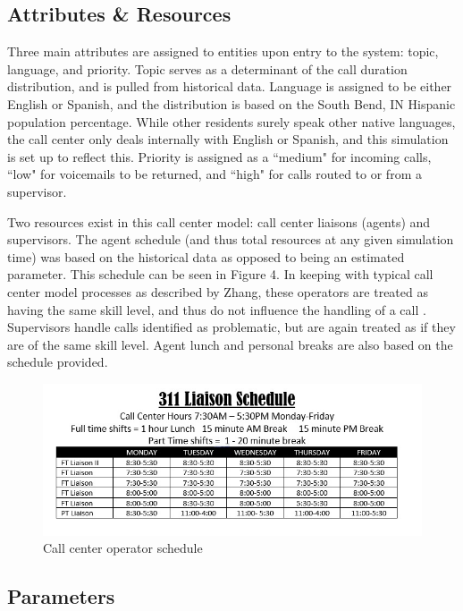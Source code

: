 \documentclass[12pt,twocolumn]{article}
\begin{document}
	\subsection{Attributes \& Resources}

Three main attributes are assigned to entities upon entry to the system:  topic, language, and priority.  Topic serves as a determinant of the call duration distribution, and is pulled from historical data.  Language is assigned to be either English or Spanish, and the distribution is based on the South Bend, IN Hispanic population percentage.  While other residents surely speak other native languages, the call center only deals internally with English or Spanish, and this simulation is set up to reflect this.  Priority is assigned as a ``medium" for incoming calls, ``low" for voicemails to be returned, and ``high" for calls routed to or from a supervisor.

\par

Two resources exist in this call center model:  call center liaisons (agents) and supervisors.  The agent schedule (and thus total resources at any given simulation time) was based on the historical data as opposed to being an estimated parameter.  This schedule can be seen in Figure 4.  In keeping with typical call center model processes as described by Zhang, these operators are treated as having the same skill level, and thus do not influence the handling of a call \cite{zhang}.  Supervisors handle calls identified as problematic, but are again treated as if they are of the same skill level.  Agent lunch and personal breaks are also based on the schedule provided.

	\begin{figure}[h]
		\includegraphics[scale=.3]{schedule2.jpg}
		\caption{Call center operator schedule}
	\end{figure}
	
	\subsection{Parameters}
	
\end{document}
